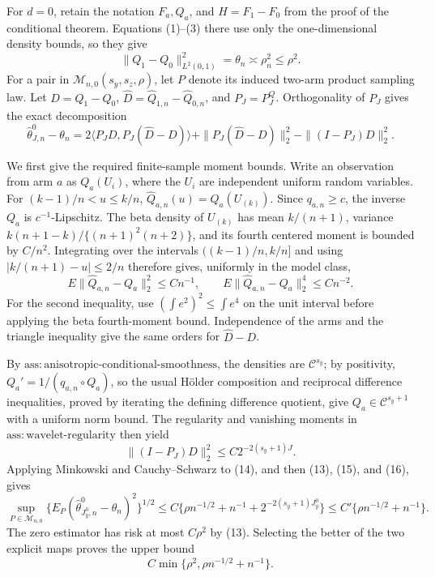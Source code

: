 For \(d=0\), retain the notation \(F_a,Q_a\), and \(H=F_1-F_0\) from the proof of the conditional theorem.  Equations (1)--(3) there use only the one-dimensional density bounds, so they give
\[
 \|Q_1-Q_0\|_{L^2(0,1)}^2=\theta_n\asymp\rho_n^2\le\rho^2. \tag{13}
\]
For a pair in \(\mathcal M_{n,0}(s_y,s_z,\rho)\), let \(P\) denote its induced two-arm product sampling law.  
Let \(D=Q_1-Q_0\), \(\widehat D=\widehat Q_{1,n}-\widehat Q_{0,n}\), and \(P_J=P^Q_J\).  Orthogonality of \(P_J\) gives the exact decomposition
\[
 \widehat\theta^0_{J,n}-\theta_n
 =2\langle P_JD,P_J(\widehat D-D)\rangle
  +\|P_J(\widehat D-D)\|_2^2
  -\|(I-P_J)D\|_2^2. \tag{14}
\]

We first give the required finite-sample moment bounds.  Write an observation from arm \(a\) as \(Q_a(U_i)\), where the \(U_i\) are independent uniform random variables.  For \((k-1)/n<u\le k/n\),
\(
 \widehat Q_{a,n}(u)=Q_a(U_{(k)}).
\)
Since \(q_{a,n}\ge c\), the inverse \(Q_a\) is \(c^{-1}\)-Lipschitz.  The beta density of \(U_{(k)}\) has mean \(k/(n+1)\), variance \(k(n+1-k)/\{(n+1)^2(n+2)\}\), and its fourth centered moment is bounded by \(C/n^2\).  Integrating over the intervals \(((k-1)/n,k/n]\) and using \(|k/(n+1)-u|\le2/n\) therefore gives, uniformly in the model class,
\[
 E\|\widehat Q_{a,n}-Q_a\|_2^2\le Cn^{-1},
 \qquad
 E\|\widehat Q_{a,n}-Q_a\|_2^4\le Cn^{-2}. \tag{15}
\]
For the second inequality, use \((\int e^2)^2\le\int e^4\) on the unit interval before applying the beta fourth-moment bound.  Independence of the arms and the triangle inequality give the same orders for \(\widehat D-D\).

By \(\mathrm{ass{:}anisotropic\text{-}conditional\text{-}smoothness}\), the densities are \(\mathcal C^{s_y}\); by positivity, \(Q_a'=1/(q_{a,n}\circ Q_a)\), so the usual H\"older composition and reciprocal difference inequalities, proved by iterating the defining difference quotient, give \(Q_a\in\mathcal C^{s_y+1}\) with a uniform norm bound.  The regularity and vanishing moments in \(\mathrm{ass{:}wavelet\text{-}regularity}\) then yield
\[
 \|(I-P_J)D\|_2^2\le C2^{-2(s_y+1)J}. \tag{16}
\]
Applying Minkowski and Cauchy--Schwarz to (14), and then (13), (15), and (16), gives
\[
 \sup_{P\in\mathcal M_{n,0}}
 \{E_P(\widehat\theta^0_{J_y^0,n}-\theta_n)^2\}^{1/2}
 \le C\{\rho n^{-1/2}+n^{-1}+2^{-2(s_y+1)J_y^0}\}
 \le C'\{\rho n^{-1/2}+n^{-1}\}. \tag{17}
\]
The zero estimator has risk at most \(C\rho^2\) by (13).  Selecting the better of the two explicit maps proves the upper bound
\[
 C\min\{\rho^2,\rho n^{-1/2}+n^{-1}\}. \tag{18}
\]


